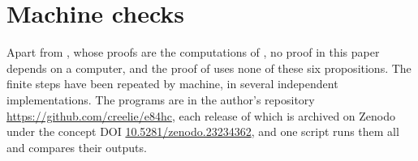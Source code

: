 \section{Machine checks}\label{app:checks}

Apart from
,
whose proofs are the computations of , no proof in this
paper depends on a computer, and the proof of  uses none
of these six propositions. The finite
steps have been repeated by machine, in several independent
implementations. The programs are in the author's repository
\url{https://github.com/creelie/e84hc}, each release of which is archived on
Zenodo under the concept DOI
\href{https://doi.org/10.5281/zenodo.23234362}{10.5281/zenodo.23234362}, and
one script runs them all and compares their outputs.

